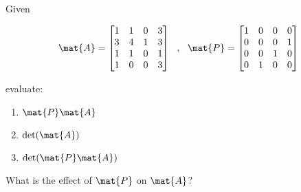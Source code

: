\bexo
Given

\begin{equation}
	\mat{A} = \begin{bmatrix}
		1& 1& 0& 3\\
		3& 4& 1& 3\\
		1& 1& 0& 1\\
		1& 0& 0& 3
	\end{bmatrix}
	~~,~~
	\mat{P} = \begin{bmatrix}
		1& 0& 0& 0\\
		0& 0& 0& 1\\
		0& 0& 1& 0\\
		0& 1& 0& 0
	\end{bmatrix}
\end{equation}

evaluate:

\begin{enumerate}
	\item $\mat{P}\mat{A}$
	\item $\mathrm{det}(\mat{A})$
	\item $\mathrm{det}(\mat{P}\mat{A})$
\end{enumerate}

What is the effect of $\mat{P}$ on $\mat{A}$?
\eexo


